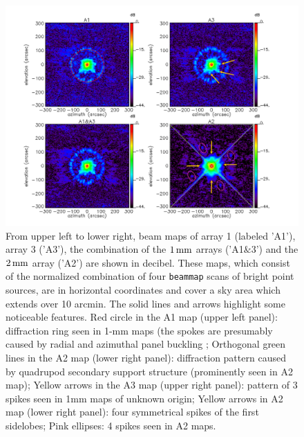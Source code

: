 \begin{figure}[!thbp]
\begin{center}
  \includegraphics[trim=0.5cm 0.5cm 1cm 0cm, clip=true, width=\linewidth]{Figures/Beams_features.pdf}
\caption[Noticeable features of NIKA2 beam pattern.]{From upper left
  to lower right, beam maps of array 1 (labeled 'A1'), array 3 ('A3'),
  the combination of the $1\,\rm{mm}$ arrays ('A1$\&$3') and the
  $2\,\rm{mm}$ array ('A2') are shown in decibel. These maps, which
  consist of the normalized combination of four {\tt beammap} scans of bright
  point sources, are in horizontal coordinates and cover a sky area
  which extends over 10 arcmin. %
  The solid lines and arrows highlight some noticeable features.
  Red circle in the
  A1 map (upper left panel): diffraction ring seen in 1-mm maps
  (the spokes are presumably caused by radial and azimuthal panel
  buckling \citep{Greve2010}; Orthogonal green lines in the A2 map (lower right panel): diffraction
  pattern caused by quadrupod secondary support structure (prominently
  seen in A2 map); Yellow arrows in the A3 map (upper right panel):
  pattern of 3 spikes seen in 1mm maps of unknown origin; Yellow
  arrows in A2 map (lower right panel): four symmetrical spikes of the
  first sidelobes; Pink ellipses: 4 spikes seen in A2 maps.}
\label{fig:features}
\end{center}
\end{figure}

